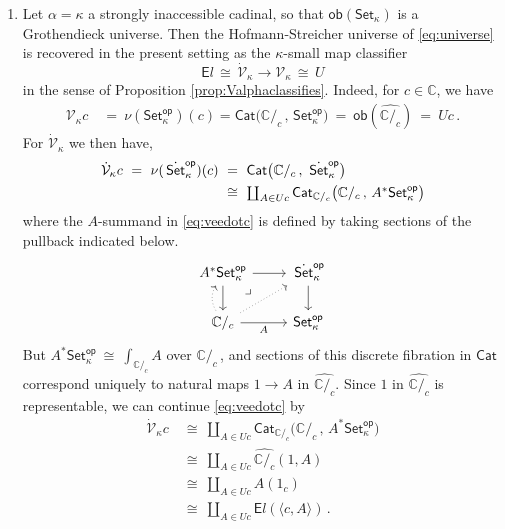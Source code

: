 \documentclass[11pt]{article}
\newcommand{\C}{\ensuremath{\mathbb{C}}}
\newcommand{\Set}{\ensuremath{\mathsf{Set}}}
\newcommand{\Cat}{\ensuremath{\mathsf{Cat}}}
\renewcommand{\to}{\ensuremath{\rightarrow}}
\newcommand{\too}{\ensuremath{\longrightarrow}}
\newcommand{\SSet}{\ensuremath{\,\dot{\Set}}}
\newcommand{\V}{\ensuremath{\mathcal{V}}}
\newcommand{\VV}{\ensuremath{\dot{\mathcal{V}}}}
\newcommand{\pbmark}{\ar[dr, phantom, "\lrcorner" very near start, shift right=.5ex]}	%
\theoremstyle{remark}
\theoremstyle{definition}
\begin{document}
\begin{enumerate}
%
\item Let $\alpha = \kappa$ a strongly inaccessible cadinal, so that $\mathsf{ob}({\Set_\kappa})$ is a Grothendieck universe.  Then the Hofmann-Streicher universe of \eqref{eq:universe} is recovered in the present setting as the $\kappa$-small map classifier
\begin{equation*}
{\mathsf{E}l}\, \cong\, \VV_\kappa \too \V_\kappa\, \cong\, U
\end{equation*}
 in the sense of Proposition \ref{prop:Valphaclassifies}.  Indeed, for $c\in\C$, we have 
 \begin{align}
  \V_{\kappa}{c}\ &=\ \nu(\Set^{\mathsf{op}}_\kappa)(c) = \Cat\big( {\C/_c}\,,\, \Set^{\mathsf{op}}_\kappa \big)\  =\ \mathsf{ob}(\widehat{\C/_c})\ =\ U{c} \,.
   \end{align} 
For $\VV_{\kappa}$ we then have,
   \begin{align}\label{eq:veedotc}
   \VV_{\kappa}{c}\ =\ \nu(\SSet^{\mathsf{op}}_\kappa)(c)\ &=\ \Cat\big( {\C/_c}\,,\, \SSet^{\mathsf{op}}_\kappa \big) \notag \\ 
   &\cong\ {\textstyle \coprod_{A\in Uc}\Cat_{{\C/_c}}\big( {\C/_c}\,,\, A^*\Set^{\mathsf{op}}_\kappa \big)}
   \end{align}
   where the $A$-summand in \eqref{eq:veedotc} is defined by taking sections of the  pullback indicated below.
   \begin{equation}\label{eq:pbforindexing}\textstyle
\begin{tikzcd}
	A^*\Set^{\mathsf{op}}_\kappa \ar[d] \ar[r] \pbmark & \SSet^{\mathsf{op}}_\kappa \ar[d]\\  
	\C/_c \ar[r,swap,"A"] \ar[u, bend left, dotted] \ar[ur, dotted] &  \Set^{\mathsf{op}}_\kappa
 \end{tikzcd}
 \end{equation}
 But $A^*\Set^{\mathsf{op}}_\kappa\ \cong\ {\textstyle \int_{\C/_c}A}$ over $\C/_c\,$, and sections of this discrete fibration in $\Cat$ correspond uniquely to natural maps $1\to A$ in $\widehat{{\C/_c}}$. Since $1$ in $\widehat{{\C/_c}}$ is representable, we can continue \eqref{eq:veedotc} by
  \begin{align*}
   \VV_{\kappa}{c}\ &\cong\ {\textstyle \coprod_{A\in Uc}\Cat_{{\C/_c}}\big( {\C/_c}\,,\, A^*\Set^{\mathsf{op}}_\kappa \big)}\\
   	&\cong\ {\textstyle \coprod_{A\in Uc} \widehat{{\C/_c}}(1, A)}\\
	&\cong\ {\textstyle \coprod_{A\in Uc} A(1_c) } \\
	& \cong\ {\textstyle \coprod_{A\in Uc} {\mathsf{E}l}(\langle c, A\rangle)}\,.
   \end{align*}
 

\end{enumerate}
\end{document}
